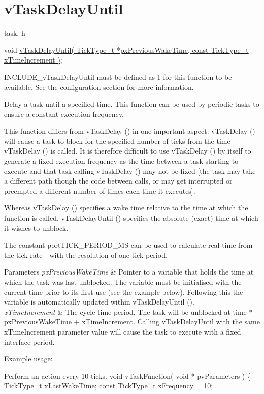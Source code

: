 \hypertarget{group__vTaskDelayUntil}{\section{v\-Task\-Delay\-Until}
\label{group__vTaskDelayUntil}
}
task. h 
\begin{DoxyPre}void \hyperlink{task_8h_a067da3e949e248096ec6c01f9cb75a47}{vTaskDelayUntil( TickType\_t *pxPreviousWakeTime, const TickType\_t xTimeIncrement )};\end{DoxyPre}


I\-N\-C\-L\-U\-D\-E\-\_\-v\-Task\-Delay\-Until must be defined as 1 for this function to be available. See the configuration section for more information.

Delay a task until a specified time. This function can be used by periodic tasks to ensure a constant execution frequency.

This function differs from v\-Task\-Delay () in one important aspect\-: v\-Task\-Delay () will cause a task to block for the specified number of ticks from the time v\-Task\-Delay () is called. It is therefore difficult to use v\-Task\-Delay () by itself to generate a fixed execution frequency as the time between a task starting to execute and that task calling v\-Task\-Delay () may not be fixed \mbox{[}the task may take a different path though the code between calls, or may get interrupted or preempted a different number of times each time it executes\mbox{]}.

Whereas v\-Task\-Delay () specifies a wake time relative to the time at which the function is called, v\-Task\-Delay\-Until () specifies the absolute (exact) time at which it wishes to unblock.

The constant port\-T\-I\-C\-K\-\_\-\-P\-E\-R\-I\-O\-D\-\_\-\-M\-S can be used to calculate real time from the tick rate -\/ with the resolution of one tick period.


\begin{DoxyParams}{Parameters}
{\em px\-Previous\-Wake\-Time} & Pointer to a variable that holds the time at which the task was last unblocked. The variable must be initialised with the current time prior to its first use (see the example below). Following this the variable is automatically updated within v\-Task\-Delay\-Until ().\\
\hline
{\em x\-Time\-Increment} & The cycle time period. The task will be unblocked at time $\ast$px\-Previous\-Wake\-Time + x\-Time\-Increment. Calling v\-Task\-Delay\-Until with the same x\-Time\-Increment parameter value will cause the task to execute with a fixed interface period.\\
\hline
\end{DoxyParams}
Example usage\-: 
\begin{DoxyPre}
Perform an action every 10 ticks.
 void vTaskFunction( void * pvParameters )
 \{
 TickType\_t xLastWakeTime;
 const TickType\_t xFrequency = 10;\end{DoxyPre}



